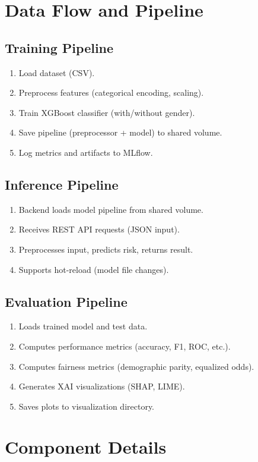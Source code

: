 \documentclass[11pt]{article}
\begin{document}
\section{Data Flow and Pipeline}
\subsection{Training Pipeline}
\begin{enumerate}
  \item Load dataset (CSV).
  \item Preprocess features (categorical encoding, scaling).
  \item Train XGBoost classifier (with/without gender).
  \item Save pipeline (preprocessor + model) to shared volume.
  \item Log metrics and artifacts to MLflow.
\end{enumerate}

\subsection{Inference Pipeline}
\begin{enumerate}
  \item Backend loads model pipeline from shared volume.
  \item Receives REST API requests (JSON input).
  \item Preprocesses input, predicts risk, returns result.
  \item Supports hot-reload (model file changes).
\end{enumerate}

\subsection{Evaluation Pipeline}
\begin{enumerate}
  \item Loads trained model and test data.
  \item Computes performance metrics (accuracy, F1, ROC, etc.).
  \item Computes fairness metrics (demographic parity, equalized odds).
  \item Generates XAI visualizations (SHAP, LIME).
  \item Saves plots to visualization directory.
\end{enumerate}

\section{Component Details}
\end{document}
